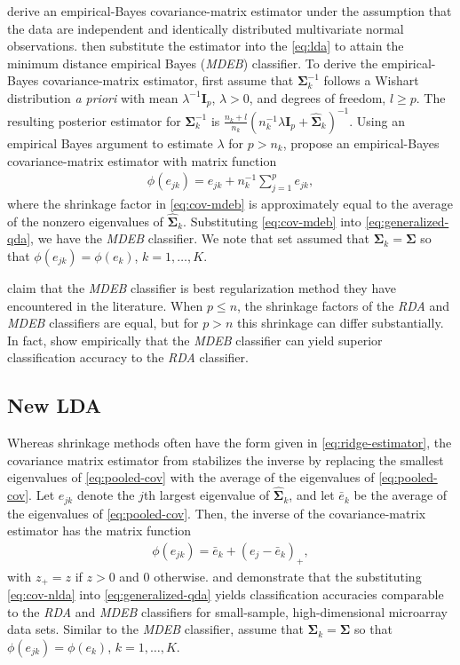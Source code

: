 \documentclass[11pt]{article}
\begin{document}
\cite{Srivastava:2007ww} derive an empirical-Bayes covariance-matrix estimator under the assumption that the data are independent and identically distributed multivariate normal observations. \cite{Srivastava:2007ww} then substitute the estimator into the \eqref{eq:lda} to attain the minimum distance empirical Bayes (\emph{MDEB}) classifier. To derive the empirical-Bayes covariance-matrix estimator, \cite{Srivastava:2007ww} first assume that $\bm \Sigma_k^{-1}$ follows a Wishart distribution \emph{a priori} with mean $\lambda^{-1} \bm I_p$, $\lambda > 0$, and degrees of freedom, $l \ge p$. The resulting posterior estimator for $\bm \Sigma_k^{-1}$ is $\frac{n_k + l}{n_k}(n_k^{-1}\lambda \bm I_p + \widehat{\bm \Sigma}_k)^{-1}$. Using an empirical Bayes argument to estimate $\lambda$ for $p > n_k$, \cite{Srivastava:2007ww} propose an empirical-Bayes covariance-matrix estimator with matrix function
\begin{align}
	\phi(e_{jk}) = e_{jk} + n_k^{-1} \sum_{j = 1}^p e_{jk},\label{eq:cov-mdeb}
\end{align}
where the shrinkage factor in \eqref{eq:cov-mdeb} is approximately equal to the average of the nonzero eigenvalues of $\widehat{\bm \Sigma}_k$. Substituting \eqref{eq:cov-mdeb} into \eqref{eq:generalized-qda}, we have the \emph{MDEB} classifier. We note that \cite{Srivastava:2007ww} set assumed that $\bm \Sigma_k = \bm \Sigma$ so that $\phi(e_{jk}) = \phi(e_k)$, $k = 1, \ldots, K$.

\cite{Srivastava:2007ww} claim that the \emph{MDEB} classifier is best regularization method they have encountered in the literature. When $p \le n$, the shrinkage factors of the \emph{RDA} and \emph{MDEB} classifiers are equal, but for $p > n$ this shrinkage can differ substantially. In fact, \cite{Ramey:2011ji} show empirically that the \emph{MDEB} classifier can yield superior classification accuracy to the \emph{RDA} classifier.


\subsection{New LDA}
Whereas shrinkage methods often have the form given in \eqref{eq:ridge-estimator}, the covariance matrix estimator from \cite{Thomaz:2006ef} stabilizes the inverse by replacing the smallest eigenvalues of \eqref{eq:pooled-cov} with the average of the eigenvalues of \eqref{eq:pooled-cov}. Let $e_{jk}$ denote the $j$th largest eigenvalue of $\widehat{\bm \Sigma}_k$, and let $\bar{e}_k$ be the average of the eigenvalues of \eqref{eq:pooled-cov}. Then, the inverse of the covariance-matrix estimator has the matrix function
\begin{align}
	\phi(e_{jk}) = \bar{e}_k + (e_j - \bar{e}_k)_+,\label{eq:cov-nlda}
\end{align}
with $z_+ = z$ if $z > 0$ and 0 otherwise. \cite*{Xu:2009fl} and \cite{Ramey:2011ji} demonstrate that the substituting \eqref{eq:cov-nlda} into \eqref{eq:generalized-qda} yields classification accuracies comparable to the \emph{RDA} and \emph{MDEB} classifiers for small-sample, high-dimensional microarray data sets. Similar to the \emph{MDEB} classifier, \cite{Thomaz:2006ef} assume that $\bm \Sigma_k = \bm \Sigma$ so that $\phi(e_{jk}) = \phi(e_k)$, $k = 1, \ldots, K$.
\end{document}
